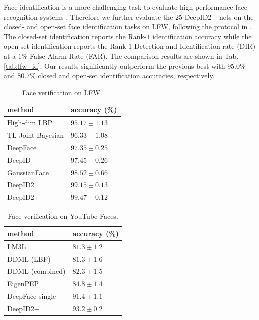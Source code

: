 \documentclass[10pt,twocolumn,letterpaper]{article}
\begin{document}
Face identification is a more challenging task to evaluate high-performance face recognition systems \cite{taigman2014b}. Therefore we further evaluate the $25$ DeepID2+ nets on the closed- and open-set face identification tasks on LFW, following the protocol  in \cite{best-rowden2014}. The closed-set identification reports the Rank-$1$ identification accuracy while the open-set identification  reports the Rank-$1$ Detection and Identification rate (DIR) at a $1\%$ False Alarm Rate (FAR). The comparison results are shown in Tab. \ref{tab:lfw_id}. Our results significantly outperform the previous best \cite{taigman2014b} with $\bm{95.0\%}$ and $\bm{80.7\%}$ closed and open-set identification accuracies, respectively.

\begin{table}[t]
\caption{Face verification on LFW.}
\label{tab:lfw}
\vspace{-0.1in}
\begin{center}
\begin{tabular}{p{100pt}|p{100pt}}
\toprule
method & accuracy (\%) \\
\midrule
High-dim LBP \cite{chen2013} & $95.17\pm1.13$ \\
TL Joint Bayesian \cite{cao2013} & $96.33\pm1.08$ \\
DeepFace \cite{taigman2014a} & $97.35\pm0.25$ \\
DeepID \cite{sun2014a} & $97.45\pm0.26$ \\
GaussianFace \cite{lu2014} & $98.52\pm0.66$ \\
DeepID2 \cite{sun2014b} & $99.15\pm0.13$ \\
DeepID2+ & $\bm{99.47\pm0.12}$ \\
\bottomrule
\end{tabular}
\end{center}
\vspace{-0.1in}
\end{table}

\begin{table}[t]
\caption{Face verification on YouTube Faces.}
\label{tab:youtube}
\vspace{-0.1in}
\begin{center}
\begin{tabular}{p{100pt}|p{100pt}}
\toprule
method & accuracy (\%) \\
\midrule
LM3L \cite{hu2014b} & $81.3\pm1.2$ \\
DDML (LBP) \cite{hu2014a} & $81.3\pm1.6$ \\
DDML (combined) \cite{hu2014a} & $82.3\pm1.5$ \\
EigenPEP \cite{li2014} & $84.8\pm1.4$ \\
DeepFace-single \cite{taigman2014a} & $91.4\pm1.1$ \\
DeepID2+ & $\bm{93.2\pm0.2}$ \\
\bottomrule
\end{tabular}
\end{center}
\vspace{-0.1in}
\end{table}
\end{document}

